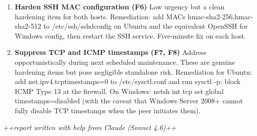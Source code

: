 \documentclass[12pt]{article}
\begin{document}
\begin{enumerate}
	\item \textbf{Harden SSH MAC configuration (F6)} Low urgency but a clean hardening item for both hosts. Remediation: add MACs hmac-sha2-256,hmac-sha2-512 to /etc/ssh/sshd\underbar{   }config on Ubuntu and the equivalent OpenSSH for Windows config, then restart the SSH service. Five-minute fix on each host.
	\item[7.~8.] \textbf{Suppress TCP and ICMP timestamps (F7, F8)} Address opportunistically during next scheduled maintenance. These are genuine hardening items but pose negligible standalone risk. Remediation for Ubuntu: add net.ipv4.tcp\underbar{   }timestamps=0 to /etc/sysctl.conf and run sysctl -p; block ICMP Type 13 at the firewall. On Windows: netsh int tcp set global timestamps=disabled (with the caveat that Windows Server 2008+ cannot fully disable TCP timestamps when the peer initiates them).
\end{enumerate}

\vfill
\textit{++report written with help from Claude (Sonnet 4.6)++}
\end{document}
